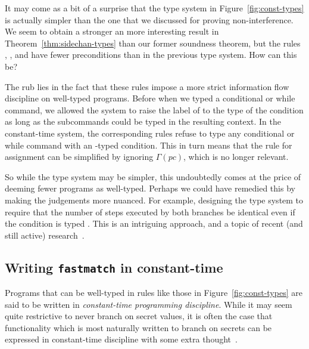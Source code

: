 \documentclass[11pt,twoside]{scrartcl}
\begin{document}
It may come as a bit of a surprise that the type system in Figure~\ref{fig:const-types} is actually simpler than the one that we discussed for proving non-interference. We seem to obtain a stronger an more interesting result in Theorem~\ref{thm:sidechan-types} than our former soundness theorem, but the rules , , and  have fewer preconditions than in the previous type system. How can this be?

The rub lies in the fact that these rules impose a more strict information flow discipline on well-typed programs. Before when we typed a conditional or while command, we allowed the system to raise the label of \pc to the type of the condition as long as the subcommands could be typed in the resulting context. In the constant-time system, the corresponding rules refuse to type any conditional or while command with an \hisec-typed condition. This in turn means that the rule for assignment can be simplified by ignoring $\Gamma(pc)$, which is no longer relevant.

So while the type system may be simpler, this undoubtedly comes at the price of deeming fewer programs as well-typed. Perhaps we could have remedied this by making the judgements more nuanced. For example, designing the type system to require that the number of steps executed by both branches be identical even if the condition is typed \hisec. This is an intriguing approach, and a topic of recent (and still active) research~\cite{Ngo17}.

\subsection{Writing \texttt{fastmatch} in constant-time}
Programs that can be well-typed in rules like those in Figure~\ref{fig:const-types} are said to be written in \emph{constant-time programming discipline}. While it may seem quite restrictive to never branch on secret values, it is often the case that functionality which is most naturally written to branch on secrets can be expressed in constant-time discipline with some extra thought~\cite{Bacelar2016}.
\end{document}
